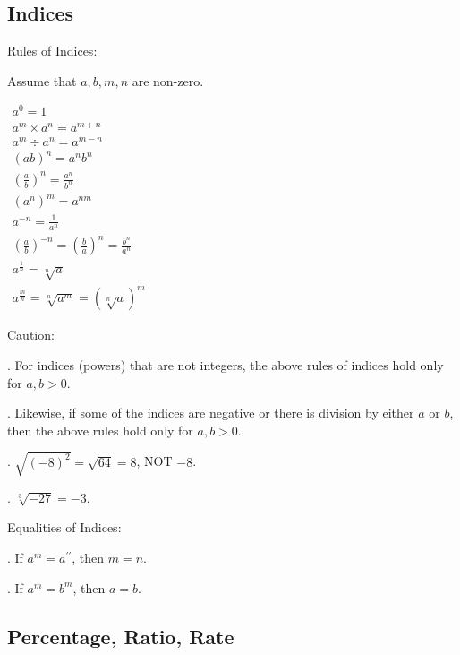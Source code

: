 \documentclass[twocolumn]{article}
\begin{document}
\subsection*{Indices}

\noindent 
Rules of Indices:

\bigskip 

\noindent 
Assume that $a,b,m,n$ are non-zero.

\noindent 
$\begin{gathered} a^0=1 \\ a^m \times a^n=a^{m+n} \\ a^m \div a^n=a^{m-n} \\ (a b)^n=a^n b^n \\ \left(\frac{a}{b}\right)^n=\frac{a^n}{b^n} \\ \left(a^n\right)^m=a^{n m} \\ a^{-n}=\frac{1}{a^n} \\ \left(\frac{a}{b}\right)^{-n}=\left(\frac{b}{a}\right)^n=\frac{b^n}{a^n} \\  a^{\frac{1}{n}}=\sqrt[n]{a} \\ a^{\frac{m}{n}}=\sqrt[n]{a^m}=(\sqrt[n]{a})^m\end{gathered}$

\noindent
Caution:

. For indices (powers) that are not integers, the above rules of indices hold only for $a,b > 0$.

. Likewise, if some of the indices are negative or there is division by either $a$ or $b$, then the above rules hold only for $a,b > 0$.

. $\sqrt{(-8)^2} = \sqrt{64} = 8$, NOT $-8$.

. $\sqrt[3]{-27} = -3$.

\bigskip 

\noindent 
Equalities of Indices:

. If $a^m=a^{\prime \prime}$, then $m=n$.

. If $a^m=b^m$, then $a=b$.

\subsection*{Percentage, Ratio, Rate}
\end{document}
